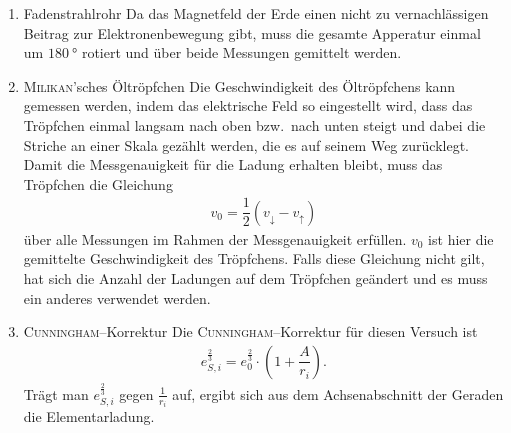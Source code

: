 \begin{enumerate}[label=--]
        \item Fadenstrahlrohr \hspace{25pt}
                Da das Magnetfeld der Erde einen nicht zu vernachlässigen Beitrag zur Elektronenbewegung gibt, muss die gesamte Apperatur einmal um $\SI{180}{\degree}$ rotiert und über beide Messungen gemittelt werden.
        \item \textsc{Milikan}'sches Öltröpfchen \hspace{25pt}
                Die Geschwindigkeit des Öltröpfchens kann gemessen werden, indem das elektrische Feld so eingestellt wird, dass das Tröpfchen einmal langsam nach oben bzw.\ nach unten steigt und dabei die Striche an einer Skala gezählt werden, die es auf seinem Weg zurücklegt.
                Damit die Messgenauigkeit für die Ladung erhalten bleibt, muss das Tröpfchen die Gleichung
                \begin{align} 
                        v_0=\dfrac{1}{2}\left(v_\downarrow - v_\uparrow\right)
                \end{align} 
                über alle Messungen im Rahmen der Messgenauigkeit erfüllen.
                $v_0$ ist hier die gemittelte Geschwindigkeit des Tröpfchens.
                Falls diese Gleichung nicht gilt, hat sich die Anzahl der Ladungen auf dem Tröpfchen geändert und es muss ein anderes verwendet werden.
        \item \textsc{Cunningham}--Korrektur \hspace{25pt}
                Die \textsc{Cunningham}--Korrektur für diesen Versuch ist
                \begin{align} 
                        e_{S,i}^{\tfrac{2}{3}}=e_0^{\tfrac{2}{3}}\cdot \left(1+\dfrac{A}{r_i}\right)
                .\end{align} 
                Trägt man $e_{S,i}^{\tfrac{2}{3}}$ gegen $\tfrac{1}{r_i}$ auf, ergibt sich aus dem Achsenabschnitt der Geraden die Elementarladung.
\end{enumerate}

